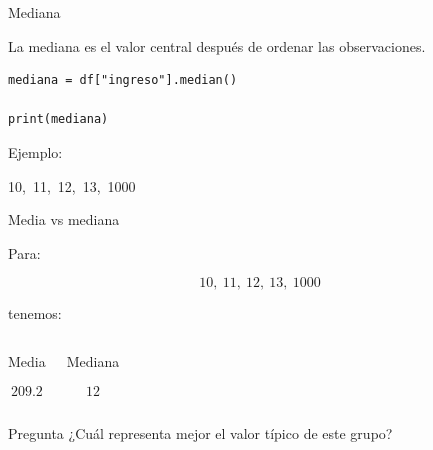 \documentclass[aspectratio=169,11pt]{beamer}
\begin{document}

\begin{frame}[fragile]{Mediana}

La mediana es el valor central después de ordenar las observaciones.

\begin{lstlisting}
mediana = df["ingreso"].median()

print(mediana)
\end{lstlisting}

Ejemplo:

\begin{center}

10,\ 11,\ 12,\ 13,\ 1000

\end{center}

\end{frame}


\begin{frame}{Media vs mediana}

Para:

\[
10,\ 11,\ 12,\ 13,\ 1000
\]

tenemos:

\begin{columns}


\begin{block}{Media}

\[
209.2
\]

\end{block}


\begin{exampleblock}{Mediana}

\[
12
\]

\end{exampleblock}

\end{columns}

\vspace{0.5cm}

\begin{alertblock}{Pregunta}
¿Cuál representa mejor el valor típico de este grupo?
\end{alertblock}

\end{frame}

\end{document}
